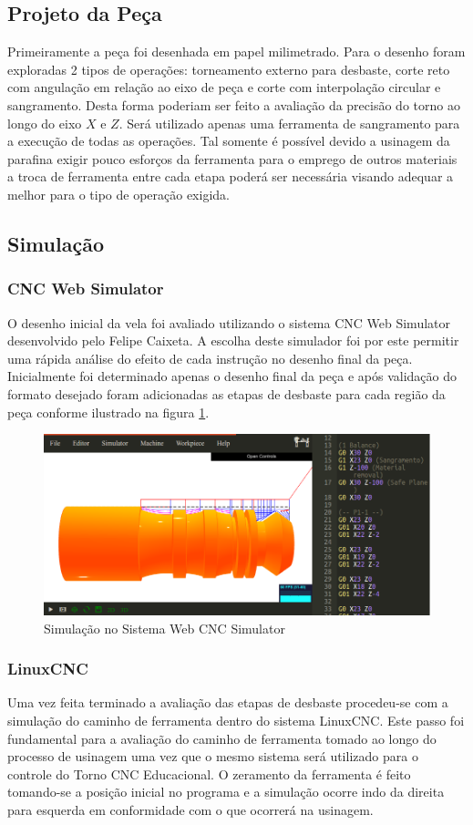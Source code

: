 \documentclass[a4paper,11pt]{article}
\begin{document}
\subsection{Projeto da Peça}
Primeiramente a peça foi desenhada em papel milimetrado. Para o desenho foram exploradas 2 tipos de operações: torneamento externo para desbaste, corte reto com angulação em relação ao eixo de peça e corte com interpolação circular e sangramento. Desta forma poderiam ser feito a avaliação da precisão do torno ao longo do eixo $X$ e $Z$. Será utilizado apenas uma ferramenta de sangramento para a execução de todas as operações. Tal somente é possível devido a usinagem da parafina exigir pouco esforços da ferramenta para o emprego de outros materiais a troca de ferramenta entre cada etapa poderá ser necessária visando adequar a melhor para o tipo de operação exigida.

\subsection{Simulação}
\subsubsection{CNC Web Simulator}
O desenho inicial da vela foi avaliado utilizando o sistema CNC Web Simulator desenvolvido pelo Felipe Caixeta.\cite{filipecaixeta_2016} A escolha deste  simulador foi por este permitir uma rápida análise do efeito de cada instrução no desenho final da peça. Inicialmente foi determinado apenas o desenho final da peça e após validação do formato desejado foram adicionadas as etapas de desbaste para cada região da peça conforme ilustrado na figura \ref{fig:vela-simCNCWebSimulator}.

\begin{figure}[H]
    \centering
    \includegraphics[width = 0.6\linewidth]{img/relat1/sim-webcnc}
    \caption{Simulação no Sistema Web CNC  Simulator}
    \label{fig:vela-simCNCWebSimulator}
\end{figure}

\subsubsection{LinuxCNC}
Uma vez feita terminado a avaliação das etapas de desbaste procedeu-se com a simulação do caminho de ferramenta dentro do sistema LinuxCNC. Este passo foi fundamental para a avaliação do caminho de ferramenta tomado ao longo do processo de usinagem uma vez que o mesmo sistema será utilizado para o controle do Torno CNC Educacional. O zeramento da ferramenta é feito tomando-se a posição inicial no programa e a simulação ocorre indo da direita para esquerda em conformidade com o que ocorrerá na usinagem.
\end{document}
